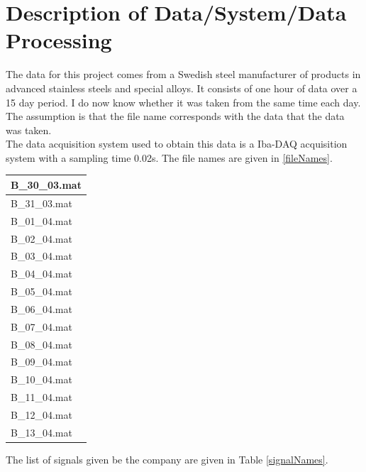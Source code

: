 \documentclass{article}
\begin{document}
\section{Description of Data/System/Data Processing}
The data for this project comes from a Swedish steel manufacturer of products in advanced stainless steels and special alloys.
It consists of one hour of data over a 15 day period. I do now know whether it was taken from the same time each day. The assumption is that the file name corresponds with the data that the data was taken.\\
The data acquisition system used to obtain this data is a Iba-DAQ acquisition system with a sampling time 0.02s. 
The file names are given in \ref{fileNames}.
\begin{center}
\begin{tabular}{ |l| } 
 \hline
 B\_30\_03.mat \\
 \hline 
 B\_31\_03.mat \\
 \hline 
 B\_01\_04.mat \\
 \hline 
 B\_02\_04.mat \\
 \hline
 B\_03\_04.mat \\
 \hline 
 B\_04\_04.mat \\
 \hline 
 B\_05\_04.mat \\
 \hline
 B\_06\_04.mat \\
 \hline 
 B\_07\_04.mat \\
 \hline 
 B\_08\_04.mat \\
 \hline 
 B\_09\_04.mat \\
 \hline 
 B\_10\_04.mat \\
 \hline
 B\_11\_04.mat \\
 \hline 
 B\_12\_04.mat \\
 \hline
 B\_13\_04.mat \\
 \hline
\end{tabular}
\label{fileNames}
\end{center}
The list of signals given be the company are given in Table \ref{signalNames}.
\end{document}
